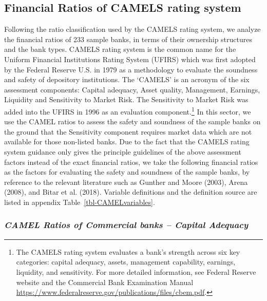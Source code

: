\documentclass[
  12pt,
  a4paper,
]{scrreprt}
\begin{document}
\subsection{Financial Ratios of CAMELS rating
system}\label{financial-ratios-of-camels-rating-system}

Following the ratio classification used by the CAMELS rating system, we
analyze the financial ratios of 233 sample banks, in terms of their
ownership structures and the bank types. CAMELS rating system is the
common name for the Uniform Financial Institutions Rating System (UFIRS)
which was first adopted by the Federal Reserve U.S. in 1979 as a
methodology to evaluate the soundness and safety of depository
institutions. The `CAMELS' is an acronym of the six assessment
components: Capital adequacy, Asset quality, Management, Earnings,
Liquidity and Sensitivity to Market Risk. The Sensitivity to Market Risk
was added into the UFIRS in 1996 as an evaluation component.\footnote{The
  CAMELS rating system evaluates a bank's strength across six key
  categories: capital adequacy, assets, management capability, earnings,
  liquidity, and sensitivity. For more detailed information, see Federal
  Reserve website and the Commercial Bank Examination Manual
  \url{https://www.federalreserve.gov/publications/files/cbem.pdf}.} In
this sector, we use the CAMEL ratios to assess the safety and soundness
of the sample banks on the ground that the Sensitivity component
requires market data which are not available for those non-listed banks.
Due to the fact that the CAMELS rating system guidance only gives the
principle guidelines of the above assessment factors instead of the
exact financial ratios, we take the following financial ratios as the
factors for evaluating the safety and soundness of the sample banks, by
reference to the relevant literature such as Gunther and Moore (2003),
Arena (2008), and Bitar et al. (2018). Variable definitions and the
definition source are listed in appendix Table~\ref{tbl-CAMELvariables}.

\subsubsection{\texorpdfstring{\emph{CAMEL Ratios of Commercial banks --
Capital
Adequacy}}{CAMEL Ratios of Commercial banks -- Capital Adequacy}}\label{camel-ratios-of-commercial-banks-capital-adequacy}
\end{document}

